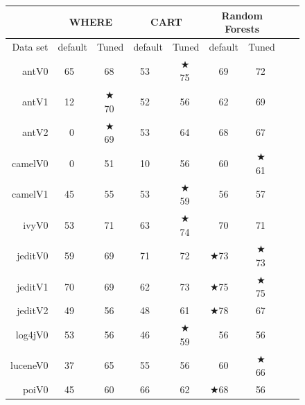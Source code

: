 \documentclass{sig-alternative}
\newcommand{\rone}{}
\newcommand{\rtwo}{}
\newcommand{\rthree}{}
\newcommand{\rfour}{}
\def\baselinestretch{1}
\begin{document}
\begin{figure}

{\scriptsize

\renewcommand{\baselinestretch}{0.8}
\begin{tabular}{r@{~}|r@{~}l@{~}|r@{~}l@{~}|r@{~}l|r@{~}l@{~}|r@{~}l@{~}|r@{~}l@{~}r@{~}l}
      &   \multicolumn{4}{c|}{WHERE}         &   \multicolumn{4}{c|}{CART}         &   \multicolumn{4}{c}{Random Forests}         \\\hline
  Data set   &   \multicolumn{2}{c}{default}         &   \multicolumn{2}{c|}{Tuned}         &   \multicolumn{2}{c}{default}         &   \multicolumn{2}{c|}{Tuned}    &   \multicolumn{2}{c}{default}  &   \multicolumn{2}{c}{Tuned}\\\hline
antV0 & 65 & {\rtwo} & 68 & {\rthree} & 53 &         & $\bigstar$75 & {\rfour} & 69 & {\rthree} & 72 & {\rfour}\\
antV1 & 12 &         & $\bigstar$70 & {\rfour} & 52 & {\rthree} & 56 & {\rthree} & 62 & {\rfour} & 69 & {\rfour}\\
antV2 & 0 &         & $\bigstar$69 & {\rfour} & 53 & {\rthree} & 64 & {\rfour} & 68 & {\rfour} & 67 & {\rfour}\\
camelV0 & 0 &         & 51 & {\rfour} & 10 &         & 56 & {\rfour} & 60 & {\rfour} & $\bigstar$61 & {\rfour}\\
camelV1 & 45 &         & 55 & {\rthree} & 53 & {\rtwo} & $\bigstar$59 & {\rfour} & 56 & {\rthree} & 57 & {\rfour}\\
ivyV0 & 53 &         & 71 & {\rfour} & 63 & {\rtwo} & $\bigstar$74 & {\rfour} & 70 & {\rfour} & 71 & {\rfour}\\
jeditV0 & 59 &         & 69 & {\rthree} & 71 & {\rfour} & 72 & {\rfour} & $\bigstar$73 & {\rfour} & $\bigstar$73 & {\rfour}\\
jeditV1 & 70 & {\rthree} & 69 & {\rtwo} & 62 &         & 73 & {\rfour} & $\bigstar$75 & {\rfour} & $\bigstar$75 & {\rfour}\\
jeditV2 & 49 &         & 56 & {\rone} & 48 &         & 61 & {\rtwo} & $\bigstar$78 & {\rfour} & 67 & {\rthree}\\
log4jV0 & 53 & {\rtwo} & 56 & {\rthree} & 46 &         & $\bigstar$59 & {\rfour} & 56 & {\rthree} & 56 & {\rthree}\\
luceneV0 & 37 &         & 65 & {\rfour} & 55 & {\rthree} & 56 & {\rthree} & 60 & {\rthree} & $\bigstar$66 & {\rfour}\\
poiV0 & 45 &         & 60 & {\rthree} & 66 & {\rfour} & 62 & {\rthree} & $\bigstar$68 & {\rfour} & 56 & {\rtwo}\\

\end{tabular}}
\end{figure}
\end{document}
